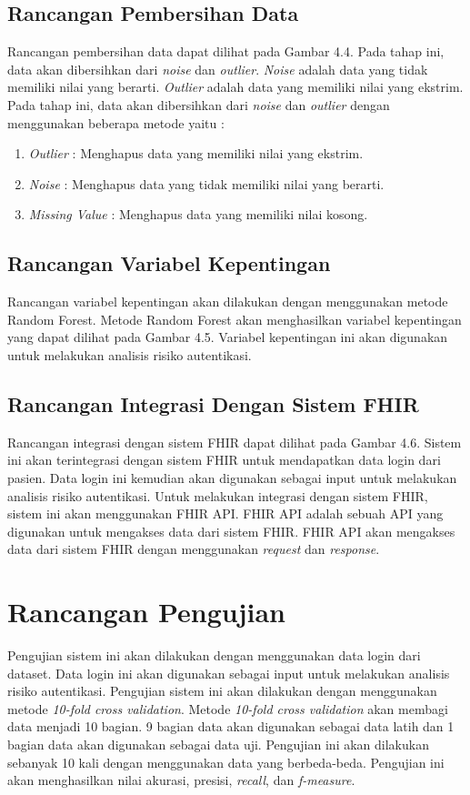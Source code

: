 \subsection{Rancangan Pembersihan Data}
Rancangan pembersihan data dapat dilihat pada Gambar 4.4. Pada tahap ini, data akan dibersihkan dari \textit{noise} dan \textit{outlier}. \textit{Noise} adalah data yang tidak memiliki nilai yang berarti. \textit{Outlier} adalah data yang memiliki nilai yang ekstrim. Pada tahap ini, data akan dibersihkan dari \textit{noise} dan \textit{outlier} dengan menggunakan beberapa metode yaitu :
\begin{enumerate}
    \item \textit{Outlier} : Menghapus data yang memiliki nilai yang ekstrim.
    \item \textit{Noise} : Menghapus data yang tidak memiliki nilai yang berarti.
    \item \textit{Missing Value} : Menghapus data yang memiliki nilai kosong.
\end{enumerate}
\subsection{Rancangan Variabel Kepentingan}
Rancangan variabel kepentingan akan dilakukan dengan menggunakan metode Random Forest. Metode Random Forest akan menghasilkan variabel kepentingan yang dapat dilihat pada Gambar 4.5. Variabel kepentingan ini akan digunakan untuk melakukan analisis risiko autentikasi.

\subsection{Rancangan Integrasi Dengan Sistem FHIR}
Rancangan integrasi dengan sistem FHIR dapat dilihat pada Gambar 4.6. Sistem ini akan terintegrasi dengan sistem FHIR untuk mendapatkan data login dari pasien. Data login ini kemudian akan digunakan sebagai input untuk melakukan analisis risiko autentikasi.
Untuk melakukan integrasi dengan sistem FHIR, sistem ini akan menggunakan FHIR API. FHIR API adalah sebuah API yang digunakan untuk mengakses data dari sistem FHIR. FHIR API akan mengakses data dari sistem FHIR dengan menggunakan \textit{request} dan \textit{response}.

\section{Rancangan Pengujian}
Pengujian sistem ini akan dilakukan dengan menggunakan data login dari dataset. Data login ini akan digunakan sebagai input untuk melakukan analisis risiko autentikasi. Pengujian sistem ini akan dilakukan dengan menggunakan metode \textit{10-fold cross validation}. Metode \textit{10-fold cross validation} akan membagi data menjadi 10 bagian. 9 bagian data akan digunakan sebagai data latih dan 1 bagian data akan digunakan sebagai data uji. Pengujian ini akan dilakukan sebanyak 10 kali dengan menggunakan data yang berbeda-beda. Pengujian ini akan menghasilkan nilai akurasi, presisi, \textit{recall}, dan \textit{f-measure}.